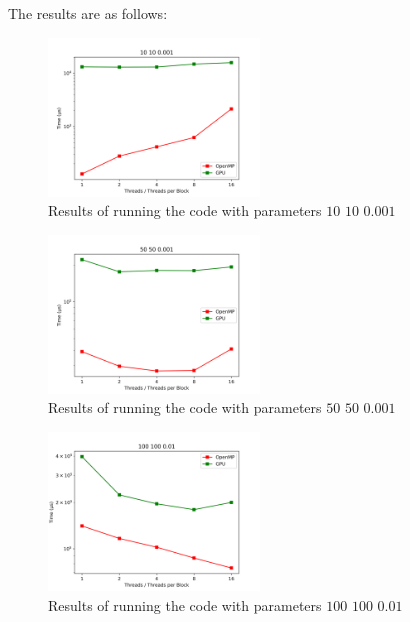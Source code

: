 \documentclass[12pt]{article}
\begin{document}
The results are as follows:



\begin{figure}[H]
	\centering
	\includegraphics[width=0.5\textwidth]{./images/Q5/10100001.png}	
	\cprotect\caption{Results of running the code with parameters $10$ $10$ $0.001$}
	\label{fig:5-1}
\end{figure}

\begin{figure}[H]
	\centering
	\includegraphics[width=0.5\textwidth]{./images/Q5/50500001.png}	
	\cprotect\caption{Results of running the code with parameters $50$ $50$ $0.001$}
	\label{fig:5-2}
\end{figure}

\begin{figure}[H]
	\centering
	\includegraphics[width=0.5\textwidth]{./images/Q5/100100001.png}	
	\cprotect\caption{Results of running the code with parameters $100$ $100$ $0.01$}
	\label{fig:5-3}
\end{figure}
\end{document}
